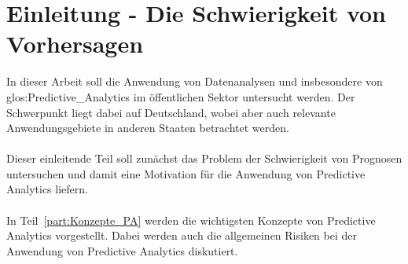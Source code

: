 \chapter{Einleitung - Die Schwierigkeit von Vorhersagen}

In dieser Arbeit soll die Anwendung von Datenanalysen und insbesondere
von \gls{glos:Predictive_Analytics} im öffentlichen Sektor untersucht werden.
Der Schwerpunkt liegt dabei auf Deutschland, wobei aber auch relevante
Anwendungsgebiete in anderen Staaten betrachtet werden. \\ \\
Dieser einleitende Teil soll zunächst das Problem der Schwierigkeit von
Prognosen untersuchen und damit eine Motivation für die Anwendung von Predictive
Analytics liefern. \\ \\
In Teil~\ref{part:Konzepte_PA} werden die wichtigsten Konzepte von Predictive
Analytics vorgestellt. Dabei werden auch die allgemeinen Risiken bei der
Anwendung von Predictive Analytics diskutiert. \\ \\
